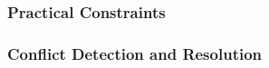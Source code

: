 \documentclass{article}
\begin{document}
\subsubsection{Practical Constraints}


\subsubsection{Conflict Detection and Resolution}
\end{document}
